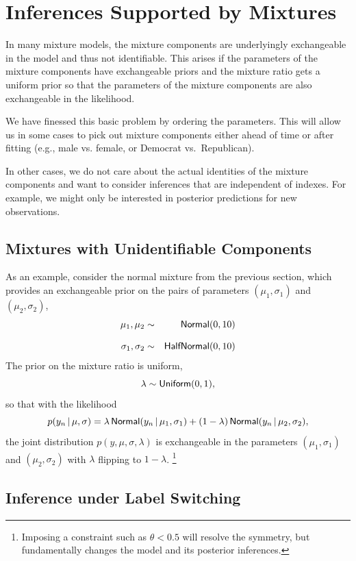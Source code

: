\section{Inferences Supported by
  Mixtures}\label{mixture-inference.section}

In many mixture models, the mixture components are underlyingly
exchangeable in the model and thus not identifiable.  This arises if
the parameters of the mixture components have exchangeable priors and
the mixture ratio gets a uniform prior so that the parameters of the
mixture components are also exchangeable in the likelihood.

We have finessed this basic problem by ordering the parameters.  This
will allow us in some cases to pick out mixture components either
ahead of time or after fitting (e.g., male vs. female, or Democrat
vs.\ Republican).

In other cases, we do not care about the actual identities of the
mixture components and want to consider inferences that are
independent of indexes.  For example, we might only be interested
in posterior predictions for new observations.

\subsection{Mixtures with Unidentifiable Components}

As an example, consider the normal mixture from the previous section,
which provides an exchangeable prior on the pairs of parameters
$(\mu_1, \sigma_1)$ and $(\mu_2, \sigma_2)$,
%
\begin{eqnarray*}
\mu_1, \mu_2 & \sim & \mbox{\sf Normal}(0, 10)
\\[8pt]
\sigma_1, \sigma_2 & \sim & \mbox{\sf HalfNormal}(0, 10)
\end{eqnarray*}
%
The prior on the mixture ratio is uniform,
%
\[
\lambda \sim \mbox{\sf Uniform}(0, 1),
\]
%
so that with the likelihood
%
\[
p(y_n \, | \, \mu, \sigma)
= \lambda \, \mbox{\sf Normal}(y_n \, | \, \mu_1, \sigma_1)
+ (1 - \lambda) \, \mbox{\sf Normal}(y_n \, | \, \mu_2, \sigma_2),
\]
%
the joint distribution $p(y, \mu, \sigma, \lambda)$ is exchangeable
in the parameters $(\mu_1, \sigma_1)$ and $(\mu_2, \sigma_2)$ with
$\lambda$ flipping to $1 - \lambda$.%
%
\footnote{Imposing a constraint such as $\theta < 0.5$ will resolve
  the symmetry, but fundamentally changes the model and its posterior
  inferences.}

\subsection{Inference under Label Switching}

